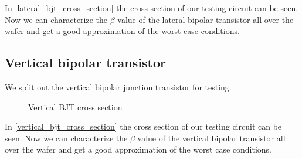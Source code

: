In \autoref{lateral_bjt_cross_section} the cross section of our testing circuit can be seen.
Now we can characterize the $\beta$ value of the lateral bipolar transistor all over the wafer and get a good approximation of the worst case conditions.

\subsection{Vertical bipolar transistor}

We split out the vertical bipolar junction transistor for testing.

\begin{figure}[H]
	\centering
	\begin{tikzpicture}[node distance = 3cm, auto, thick,scale=0.5, every node/.style={transform shape}]
		
	\end{tikzpicture}
	\caption{Vertical BJT cross section}
	\label{vertical_bjt_cross_section}
\end{figure}

In \autoref{vertical_bjt_cross_section} the cross section of our testing circuit can be seen.
Now we can characterize the $\beta$ value of the vertical bipolar transistor all over the wafer and get a good approximation of the worst case conditions.
